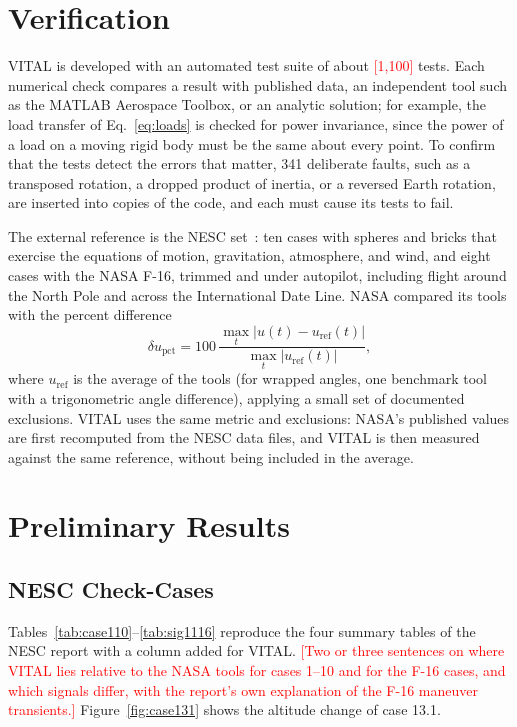 \documentclass[conf]{new-aiaa}
\newcommand{\tbd}[1]{\textcolor{red}{[#1]}}
\begin{document}
\section{Verification}
VITAL is developed with an automated test suite of about \tbd{1,100} tests. Each numerical
check compares a result with published data, an independent tool such as the MATLAB
Aerospace Toolbox, or an analytic solution; for example, the load transfer of
Eq.~\eqref{eq:loads} is checked for power invariance, since the power of a load on a moving
rigid body must be the same about every point. To confirm that the tests detect the errors
that matter, 341 deliberate faults, such as a transposed rotation, a dropped product of
inertia, or a reversed Earth rotation, are inserted into copies of the code, and each must
cause its tests to fail.

The external reference is the NESC set~\cite{nesc2015}: ten cases with spheres and bricks that
exercise the equations of motion, gravitation, atmosphere, and wind, and eight cases with the
NASA F-16, trimmed and under autopilot, including flight around the North Pole and across
the International Date Line. NASA compared its tools with the percent difference
\begin{equation}
\label{eq:pct}
\delta u_{\mathrm{pct}} = 100\,
  \frac{\max_t \left| u(t) - u_{\mathrm{ref}}(t) \right|}
       {\max_{t} \left| u_{\mathrm{ref}}(t) \right|},
\end{equation}
where $u_{\mathrm{ref}}$ is the average of the tools (for wrapped angles, one benchmark tool
with a trigonometric angle difference), applying a small set of documented exclusions. VITAL
uses the same metric and exclusions: NASA's published values are first recomputed from the
NESC data files, and VITAL is then measured against the same reference, without being
included in the average.

\section{Preliminary Results}
\subsection{NESC Check-Cases}
Tables~\ref{tab:case110}--\ref{tab:sig1116} reproduce the four summary tables of the NESC
report with a column added for VITAL. \tbd{Two or three sentences on where VITAL lies relative
to the NASA tools for cases 1--10 and for the F-16 cases, and which signals differ, with the
report's own explanation of the F-16 maneuver transients.} Figure~\ref{fig:case131} shows the
altitude change of case 13.1.
\end{document}
